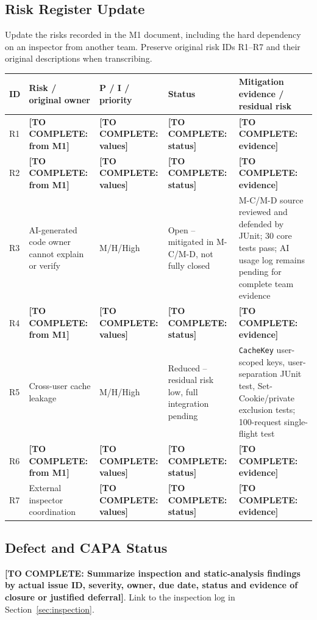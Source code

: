 \documentclass[11pt,a4paper]{article}
\newcommand{\todo}[1]{\textcolor{red!70!black}{\textbf{[TO COMPLETE: #1]}}}
\begin{document}
\subsection{Risk Register Update}
Update the risks recorded in the M1 document, including the hard dependency on an inspector from another team. Preserve original risk IDs R1--R7 and their original descriptions when transcribing.
\begin{longtable}{L{1.1cm} L{3.5cm} L{2.1cm} L{2.4cm} L{3.5cm}}\toprule
\textbf{ID} & \textbf{Risk / original owner} & \textbf{P / I / priority} & \textbf{Status} & \textbf{Mitigation evidence / residual risk}\\\midrule\endhead
R1 & \todo{from M1} & \todo{values} & \todo{status} & \todo{evidence}\\
R2 & \todo{from M1} & \todo{values} & \todo{status} & \todo{evidence}\\
R3 & AI-generated code owner cannot explain or verify & M/H/High & Open -- mitigated in M-C/M-D, not fully closed & M-C/M-D source reviewed and defended by JUnit; 30 core tests pass; AI usage log remains pending for complete team evidence\\
R4 & \todo{from M1} & \todo{values} & \todo{status} & \todo{evidence}\\
R5 & Cross-user cache leakage & M/H/High & Reduced -- residual risk low, full integration pending & \texttt{CacheKey} user-scoped keys, user-separation JUnit test, Set-Cookie/private exclusion tests; 100-request single-flight test\\
R6 & \todo{from M1} & \todo{values} & \todo{status} & \todo{evidence}\\
R7 & External inspector coordination & \todo{values} & \todo{status} & \todo{evidence}\\\bottomrule\end{longtable}
\subsection{Defect and CAPA Status}
\todo{Summarize inspection and static-analysis findings by actual issue ID, severity, owner, due date, status and evidence of closure or justified deferral}. Link to the inspection log in Section~\ref{sec:inspection}.
\end{document}

